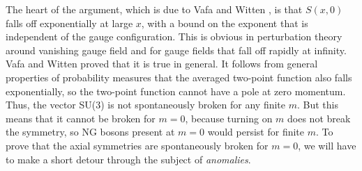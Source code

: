 The heart of the argument, which is due to Vafa and Witten \cite{banks-ref-99}, is that
$S(x,0)$ falls off exponentially at large $x$, with a bound on the exponent
that is independent of the gauge configuration. This is obvious in
perturbation theory around vanishing gauge field and for gauge fields that fall
off rapidly at infinity. Vafa and Witten proved that it is true in general. It
follows from general properties of probability measures that the averaged
two-point function also falls exponentially, so the two-point function cannot
have a pole at zero momentum. Thus, the vector SU(3) is not spontaneously
broken for any finite $m$. But this means that it cannot be broken for $m=0$,
because turning on $m$ does not break the symmetry, so NG bosons present at
$m=0$ would persist for finite $m$. To prove that the axial symmetries are
spontaneously broken for $m=0$, we will have to make a short detour through
the subject of \emph{anomalies}.

